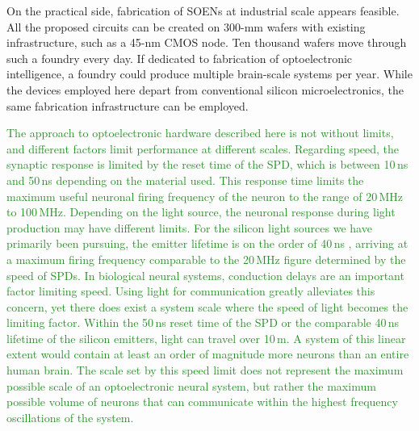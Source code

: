 \documentclass[twocolumn]{article}
\begin{document}
On the practical side, fabrication of SOENs at industrial scale appears feasible. All the proposed circuits can be created on 300-mm wafers with existing infrastructure, such as a 45-nm CMOS node. Ten thousand wafers move through such a foundry every day. If dedicated to fabrication of optoelectronic intelligence, a foundry could produce multiple brain-scale systems per year. While the devices employed here depart from conventional silicon microelectronics, the same fabrication infrastructure can be employed. 

\textcolor{ForestGreen}{The approach to optoelectronic hardware described here is not without limits, and different factors limit performance at different scales. Regarding speed, the synaptic response is limited by the reset time of the SPD, which is between 10\,ns and 50\,ns depending on the material used. This response time limits the maximum useful neuronal firing frequency of the neuron to the range of 20\,MHz to 100\,MHz. Depending on the light source, the neuronal response during light production may have different limits. For the silicon light sources we have primarily been pursuing, the emitter lifetime is on the order of 40\,ns \cite{buta2020}, arriving at a maximum firing frequency comparable to the 20\,MHz figure determined by the speed of SPDs. In biological neural systems, conduction delays are an important factor limiting speed. Using light for communication greatly alleviates this concern, yet there does exist a system scale where the speed of light becomes the limiting factor. Within the 50\,ns reset time of the SPD or the comparable 40\,ns lifetime of the silicon emitters, light can travel over 10\,m. A system of this linear extent would contain at least an order of magnitude more neurons than an entire human brain. The scale set by this speed limit does not represent the maximum possible scale of an optoelectronic neural system, but rather the maximum possible volume of neurons that can communicate within the highest frequency oscillations of the system.}
\end{document}
